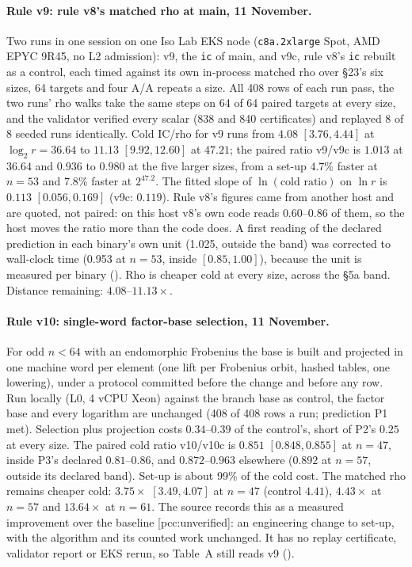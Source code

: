 \paragraph{Rule v9: rule v8's matched rho at main, 11 November.} Two runs in
one session on one Iso Lab EKS node (\texttt{c8a.2xlarge} Spot, AMD EPYC
9R45, no L2 admission): v9, the \texttt{ic} of main, and v9c, rule v8's
\texttt{ic} rebuilt as a control, each timed against its own in-process
matched rho over §23's six sizes, 64 targets and four A/A repeats a size.
All 408 rows of each run pass, the two runs' rho walks take the same steps
on 64 of 64 paired targets at every size, and the validator verified every
scalar (838 and 840 certificates) and replayed 8 of 8 seeded runs
identically. Cold IC/rho for v9 runs from $4.08$ $[3.76,4.44]$ at
$\log_2r=36.64$ to $11.13$ $[9.92,12.60]$ at $47.21$; the paired ratio v9/v9c
is $1.013$ at $36.64$ and $0.936$ to $0.980$ at the five larger sizes, from a
set-up $4.7$\% faster at $n=53$ and $7.8$\% faster at $2^{47.2}$. The fitted
slope of $\ln(\text{cold ratio})$ on $\ln r$ is $0.113$ $[0.056,0.169]$
(v9c: $0.119$). Rule v8's figures came from another host and are quoted,
not paired: on this host v8's own code reads $0.60$--$0.86$ of them, so the
host moves the ratio more than the code does. A first reading of the
declared prediction in each binary's own unit (1.025, outside the band) was
corrected to wall-clock time (0.953 at $n=53$, inside $[0.85,1.00]$),
because the unit is measured per binary
(). Rho is cheaper
cold at every size, across the §5a band. Distance remaining:
$4.08$--$11.13\times$.

\paragraph{Rule v10: single-word factor-base selection, 11 November.} For
odd $n<64$ with an endomorphic Frobenius the base is built and projected in
one machine word per element (one lift per Frobenius orbit, hashed tables,
one lowering), under a protocol committed before the change and before any
row. Run locally (L0, 4 vCPU Xeon) against the branch base as control, the
factor base and every logarithm are unchanged (408 of 408 rows a run;
prediction P1 met). Selection plus projection costs $0.34$--$0.39$ of the
control's, short of P2's $0.25$ at every size. The paired cold ratio
v10/v10c is $0.851$ $[0.848,0.855]$ at $n=47$, inside P3's declared
$0.81$--$0.86$, and $0.872$--$0.963$ elsewhere ($0.892$ at $n=57$, outside
its declared band). Set-up is about 99\% of the cold cost. The matched rho
remains cheaper cold: $3.75\times$ $[3.49,4.07]$ at $n=47$ (control
$4.41$), $4.43\times$ at $n=57$ and $13.64\times$ at $n=61$. The source
records this as a measured improvement over the baseline [pcc:unverified]:
an engineering change to set-up, with the algorithm and its counted work
unchanged. It has no replay certificate, validator report or EKS rerun, so
Table~A still reads v9 ().

